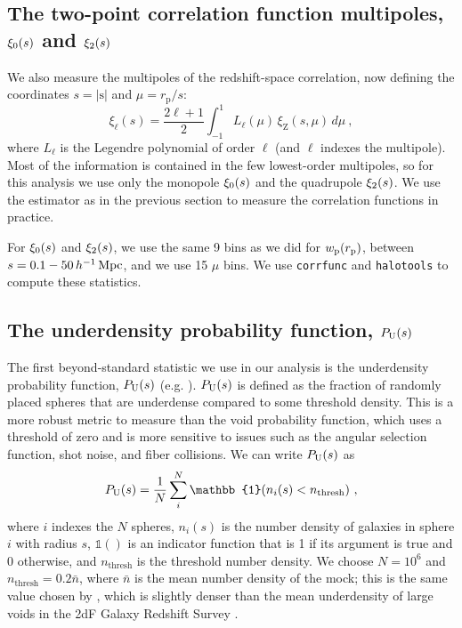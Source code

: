 \subsection{The two-point correlation function multipoles, \texorpdfstring{$\xi_0(s)$ and $\xi_2(s)$}{xi0(s) and xi2(s)}} 
\label{sec:cfs}

We also measure the multipoles of the redshift-space correlation, now defining the coordinates $s = |\bm{\mathrm{s}}|$ and $\mu = r_\mathrm{p}/s$:
\begin{equation}
\xi_{\ell}(s) = \frac{2\ell+1}{2}\int_{-1}^{1} L_{\ell}(\mu) \, \xi_\mathrm{Z}(s, \mu) \, d\mu ~,
\end{equation}
where $L_{\ell}$ is the Legendre polynomial of order $\ell$ (and $\ell$ indexes the multipole).
Most of the information is contained in the few lowest-order multipoles, so for this analysis we use only the monopole $\xi_0(s)$ and the quadrupole $\xi_2(s)$.
We use the \cite{LandySzalay1993} estimator as in the previous section to measure the correlation functions in practice.

For $\xi_0(s)$ and $\xi_2(s)$, we use the same 9 bins as we did for $w_\mathrm{p}(r_\mathrm{p})$, between $s = 0.1-50 \, h^{-1}\,\mathrm{Mpc}$, and we use 15 $\mu$ bins.
We use \texttt{corrfunc} \citep{SinhaGarrison2019, Sinha2020} and \texttt{halotools} \citep{Hearin2017} to compute these statistics.


\subsection{The underdensity probability function, \texorpdfstring{$P_\mathrm{U}(s)$}{P(s)}}
\label{sec:upf}

The first beyond-standard statistic we use in our analysis is the underdensity probability function, $P_\mathrm{U}(s)$ (e.g. \citealt{HoyleVogeley2004}).
$P_\mathrm{U}(s)$ is defined as the fraction of randomly placed spheres that are underdense compared to some threshold density.
This is a more robust metric to measure than the void probability function, which uses a threshold of zero and is more sensitive to issues such as the angular selection function, shot noise, and fiber collisions.
We can write $P_\mathrm{U}(s)$ as
\begin{equation}
	\upf = \frac{1}{N} \sum_i^N \mathbb{1}(n_i(s) < n_\mathrm{thresh}) ~,
\end{equation}
where $i$ indexes the $N$ spheres, $n_i(s)$ is the number density of galaxies in sphere $i$ with radius $s$, $\mathbb{1}()$ is an indicator function that is 1 if its argument is true and 0 otherwise, and $n_\mathrm{thresh}$ is the threshold number density. 
We choose $N=10^6$ and $n_\mathrm{thresh} = 0.2 \bar{n}$, where $\bar{n}$ is the mean number density of the mock; this is the same value chosen by \cite{HoyleVogeley2004}, which is slightly denser than the mean underdensity of large voids in the 2dF Galaxy Redshift Survey \citep{Colless2003}.

